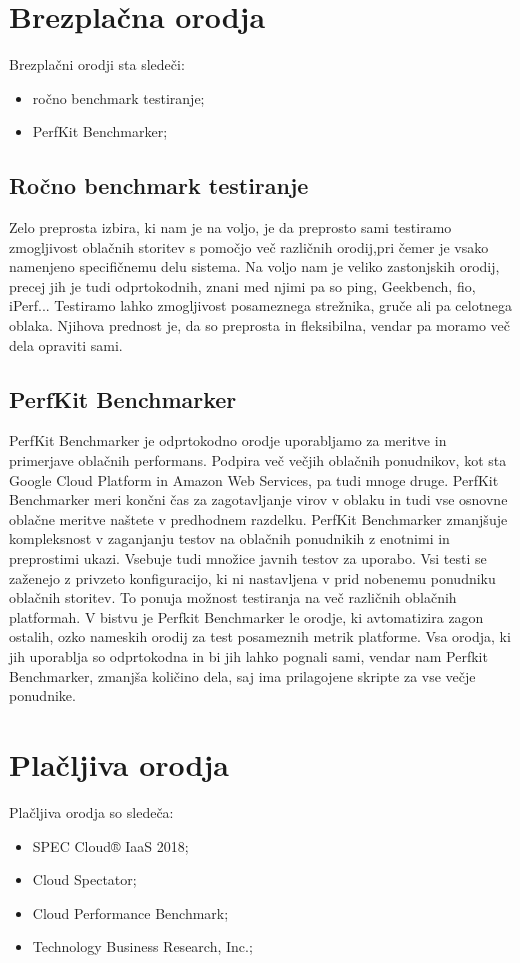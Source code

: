 \section{Brezplačna orodja}
Brezplačni orodji sta sledeči:
\begin{itemize}
\item ročno benchmark testiranje;
\item PerfKit Benchmarker;
\end{itemize}

\subsection{Ročno benchmark testiranje}
Zelo preprosta izbira, ki nam je na voljo, je da preprosto sami testiramo zmogljivost oblačnih storitev s pomočjo več različnih orodij,pri čemer je vsako namenjeno specifičnemu delu sistema. Na voljo nam je veliko zastonjskih orodij, precej jih je tudi odprtokodnih, znani med njimi pa so ping, Geekbench, fio, iPerf... Testiramo lahko zmogljivost posameznega strežnika, gruče ali pa celotnega oblaka. Njihova prednost je, da so preprosta in fleksibilna, vendar pa moramo več dela opraviti sami.

\subsection{PerfKit Benchmarker}
PerfKit Benchmarker je odprtokodno orodje uporabljamo za meritve in primerjave oblačnih performans.
Podpira več večjih oblačnih ponudnikov, kot sta Google Cloud Platform in Amazon Web Services, pa tudi mnoge druge.
PerfKit Benchmarker meri končni čas za zagotavljanje virov v oblaku in tudi vse osnovne oblačne meritve naštete v predhodnem razdelku. PerfKit Benchmarker zmanjšuje kompleksnost v zaganjanju testov na oblačnih ponudnikih z enotnimi in preprostimi ukazi.
Vsebuje tudi množice javnih testov za uporabo. Vsi testi se zaženejo z privzeto konfiguracijo, ki ni nastavljena v prid nobenemu ponudniku oblačnih storitev. To ponuja možnost testiranja na več različnih oblačnih platformah.
V bistvu je Perfkit Benchmarker le orodje, ki avtomatizira zagon ostalih, ozko nameskih orodij za test posameznih metrik platforme. Vsa orodja, ki jih uporablja so odprtokodna in bi jih lahko pognali sami, vendar nam Perfkit Benchmarker, zmanjša količino dela, saj ima prilagojene skripte za vse večje ponudnike.

\section{Plačljiva orodja}
Plačljiva orodja so sledeča:
\begin{itemize}
\item SPEC Cloud® IaaS 2018;
\item Cloud Spectator;
\item Cloud Performance Benchmark;
\item Technology Business Research, Inc.;
\end{itemize}

